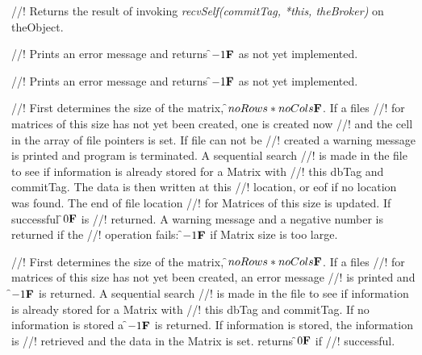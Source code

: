 //! Returns the result of invoking {\em recvSelf(commitTag, *this, theBroker)} on
\p theObject.
		
//! Prints an error message and returns \f$-1{\bf F}$ as not yet implemented.

//! Prints an error message and returns \f$-1{\bf F}$ as not yet implemented.

//! First determines the size of the matrix, \f$noRows * noCols{\bf F}$. If a files
//! for matrices of this size has not yet been created, one is created now
//! and the cell in the array of file pointers is set. If file can not be
//! created a warning message is printed and program is terminated. A sequential search
//! is made in the file to see if information is already stored for a Matrix with
//! this \p dbTag and \p commitTag. The data is then written at this
//! location, or eof if no location was found. The end of file location
//! for Matrices of this size is updated. If successful \f$0{\bf F}$ is
//! returned. A warning message and a negative number is returned if the
//! operation fails: \f$-1{\bf F}$ if Matrix size is too large.

//! First determines the size of the matrix, \f$noRows * noCols{\bf F}$. If a files
//! for matrices of this size has not yet been created, an error message
//! is printed and \f$-1{\bf F}$ is returned.  A sequential search
//! is made in the file to see if information is already stored for a Matrix with
//! this \p dbTag and \p commitTag. If no information is stored a
\f$-1{\bf F}$ is returned. If information is stored, the information is
//! retrieved and the data in the Matrix is set. returns \f$0{\bf F}$ if
//! successful.

